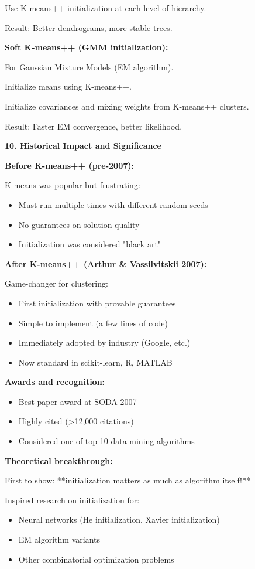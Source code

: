 \documentclass[12pt]{article}
\begin{document}
\begin{explanation}
Use K-means++ initialization at each level of hierarchy.

Result: Better dendrograms, more stable trees.

\textbf{Soft K-means++ (GMM initialization):}

For Gaussian Mixture Models (EM algorithm).

Initialize means using K-means++.

Initialize covariances and mixing weights from K-means++ clusters.

Result: Faster EM convergence, better likelihood.

\textbf{10. Historical Impact and Significance}

\textbf{Before K-means++ (pre-2007):}

K-means was popular but frustrating:
\begin{itemize}
    \item Must run multiple times with different random seeds
    \item No guarantees on solution quality
    \item Initialization was considered "black art"
\end{itemize}

\textbf{After K-means++ (Arthur \& Vassilvitskii 2007):}

Game-changer for clustering:
\begin{itemize}
    \item First initialization with provable guarantees
    \item Simple to implement (a few lines of code)
    \item Immediately adopted by industry (Google, etc.)
    \item Now standard in scikit-learn, R, MATLAB
\end{itemize}

\textbf{Awards and recognition:}

\begin{itemize}
    \item Best paper award at SODA 2007
    \item Highly cited (>12,000 citations)
    \item Considered one of top 10 data mining algorithms
\end{itemize}

\textbf{Theoretical breakthrough:}

First to show: **initialization matters as much as algorithm itself!**

Inspired research on initialization for:
\begin{itemize}
    \item Neural networks (He initialization, Xavier initialization)
    \item EM algorithm variants
    \item Other combinatorial optimization problems
\end{itemize}


\end{explanation}
\end{document}
